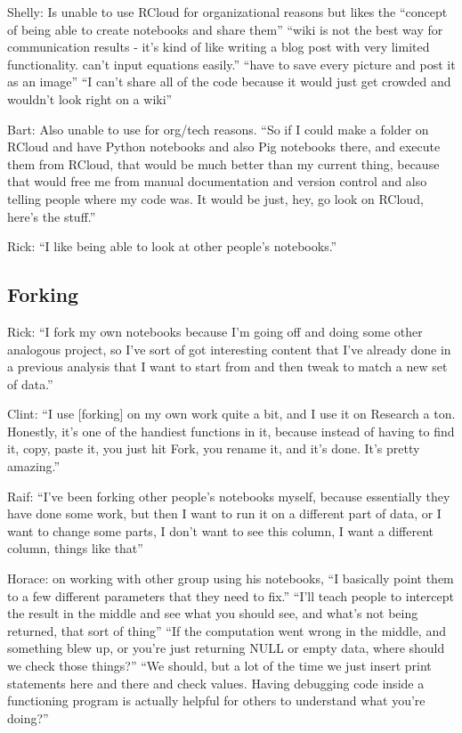 Shelly: Is unable to use RCloud for organizational reasons but likes the
``concept of being able to create notebooks and share them'' ``wiki is not the
best way for communication results - it's kind of like writing a blog post with
very limited functionality. can't input equations easily.'' ``have to save every
picture and post it as an image'' ``I can't share all of the code because it
would just get crowded and wouldn't look right on a wiki''

Bart: Also unable to use for org/tech reasons. ``So if I could make a folder on
RCloud and have Python notebooks and also Pig notebooks there, and execute them
from RCloud, that would be much better than my current thing, because that would
free me from manual documentation and version control and also telling people
where my code was. It would be just, hey, go look on RCloud, here's the stuff.''

Rick: ``I like being able to look at other people's notebooks.''

\subsection{Forking}
Rick: ``I fork my own notebooks because I'm going off and doing some other
analogous project, so I've sort of got interesting content that I've already
done in a previous analysis that I want to start from and then tweak to match a
new set of data.''

Clint: ``I use [forking] on my own work quite a bit, and I use it on Research a
ton. Honestly, it's one of the handiest functions in it, because instead of
having to find it, copy, paste it, you just hit Fork, you rename it, and it's
done. It's pretty amazing.''

Raif: ``I've been forking other people's notebooks myself, because essentially
they have done some work, but then I want to run it on a different part of data,
or I want to change some parts, I don't want to see this column, I want a
different column, things like that''

Horace: on working with other group using his notebooks, ``I basically point
them to a few different parameters that they need to fix.'' ``I'll teach people
to intercept the result in the middle and see what you should see, and what's
not being returned, that sort of thing'' ``If the computation went wrong in the
middle, and something blew up, or you're just returning NULL or empty data,
where should we check those things?'' ``We should, but a lot of the time we just
insert print statements here and there and check values. Having debugging code
inside a functioning program is actually helpful for others to understand what
you're doing?''

